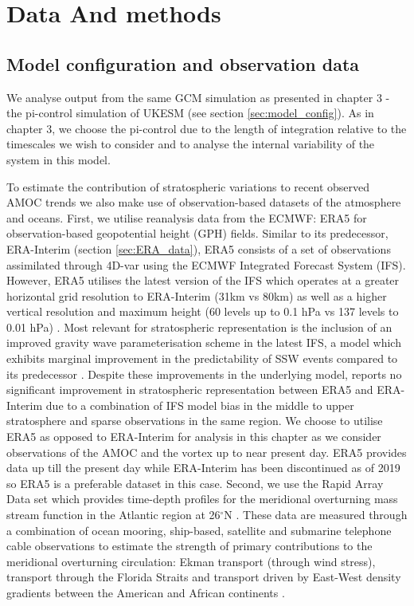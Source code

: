 \section{Data And methods}
\subsection{Model configuration and observation data}

We analyse output from the same GCM simulation as presented in chapter 3 - the pi-control simulation of UKESM (see section \ref{sec:model_config}). As in chapter 3, we choose the pi-control due to the length of integration relative to the timescales we wish to consider and to analyse the internal variability of the system in this model. 

To estimate the contribution of stratospheric variations to recent observed AMOC trends we also make use of observation-based datasets of the atmosphere and oceans. First, we utilise reanalysis data from the ECMWF: ERA5 \citep{hersbachERA52020c} for observation-based geopotential height (GPH) fields. Similar to its predecessor, ERA-Interim (section \ref{sec:ERA_data}), ERA5 consists of a set of observations assimilated through 4D-var using the ECMWF Integrated Forecast System (IFS). However, ERA5 utilises the latest version of the IFS which operates at a greater horizontal grid resolution to ERA-Interim (31km vs 80km) as well as a higher vertical resolution and maximum height (60 levels up to 0.1 hPa vs 137 levels to 0.01 hPa) \citep{hersbachERA52020c}. Most relevant for stratospheric representation is the inclusion of an improved gravity wave parameterisation scheme in the latest IFS, a model which exhibits marginal improvement in the predictability of SSW events compared to its predecessor \citep{orrImproved2010a}. Despite these improvements in the underlying model, \cite{hersbachERA52020c} reports no significant improvement in stratospheric representation between ERA5 and ERA-Interim due to a combination of IFS model bias in the middle to upper stratosphere and sparse observations in the same region. We choose to utilise ERA5 as opposed to ERA-Interim for analysis in this chapter as we consider observations of the AMOC and the vortex up to near present day. ERA5 provides data up till the present day while ERA-Interim has been discontinued as of 2019 so ERA5 is a preferable dataset in this case. 
Second, we use the Rapid Array Data set which provides time-depth profiles for the meridional overturning mass stream function in the Atlantic region at 26$^{\circ}$N \citep{moatAtlantic2020c}. These data are measured through a combination of ocean mooring, ship-based, satellite and submarine telephone cable observations to estimate the strength of primary contributions to the meridional overturning circulation: Ekman transport (through wind stress), transport through the Florida Straits and transport driven by East-West density gradients between the American and African continents \citep{mccarthyMeasuring2015b}.

